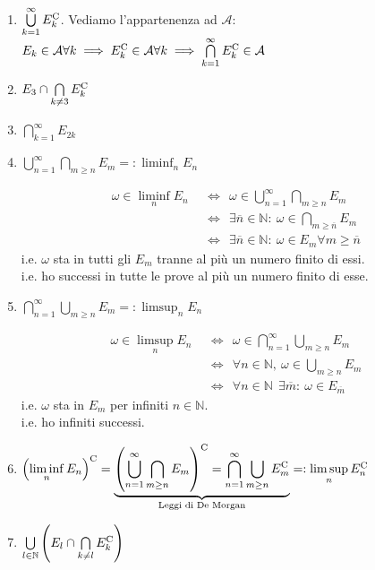 \begin{enumerate}
	\item $\bigcup\limits _{k=1}^{\infty } E_{k}^{\mathrm{C}}$. Vediamo l'appartenenza ad $\mathcal{A}$: $E_{k} \in \mathcal{A} \forall k\implies  E_{k}^{\mathrm{C}} \in \mathcal{A} \forall k\implies  \bigcap\limits _{k=1}^{\infty } E_{k}^{\mathrm{C}} \in \mathcal{A}$
	\item $E_{3} \cap \bigcap\limits _{k\neq 3} E_{k}^{\mathrm{C}}$
	\item $\bigcap\limits _{k=1}^{\infty } E_{2k}$
	\item $\bigcup\limits _{n=1}^{\infty }\bigcap\limits _{m\geq n} E_{m} =:\liminf _{n} E_{n}$
	\begin{oss}
		\begin{align*}
			\omega \in \liminf _{n} E_{n} & \ \ \iff \ \ \omega \in \bigcup _{n=1}^{\infty }\bigcap _{m\geq n} E_{m}\\
			 & \ \ \iff \ \ \exists \overline{n} \in \mathbb{N} :\ \omega \in \bigcap _{m\geq \overline{n}} E_{m}\\
			 & \ \ \iff \ \ \exists \overline{n} \in \mathbb{N} :\ \omega \in E_{m} \forall m\geq \overline{n}
		\end{align*}
		i.e. $\omega $ sta in tutti gli $E_{m}$ tranne al più un numero finito di essi.\\
		i.e. ho successi in tutte le prove al più un numero finito di esse.
	\end{oss}
	\item $\bigcap\limits _{n=1}^{\infty }\bigcup\limits _{m\geq n} E_{m} =:\limsup _{n} E_{n}$
	\begin{oss}
		\begin{align*}
			\omega \in \limsup _{n} E_{n} & \ \ \iff \ \ \omega \in \bigcap _{n=1}^{\infty }\bigcup _{m\geq n} E_{m}\\
			 & \ \ \iff \ \ \forall n\in \mathbb{N} ,\ \omega \in \bigcup _{m\geq n} E_{m}\\
			 & \ \ \iff \ \ \forall n\in \mathbb{N} \ \ \exists \overline{m} :\ \omega \in E_{\overline{m}}
		\end{align*}
		i.e. $\omega $ sta in $E_{m}$ per infiniti $n\in \mathbb{N}$.\\
		i.e. ho infiniti successi.
	\end{oss}
	\item $\left(\liminf\limits _{n} E_{n}\right)^{\mathrm{C}} =\underbrace{\left(\bigcup\limits _{n=1}^{\infty }\bigcap\limits _{m\geq n} E_{m}\right)^{\mathrm{C}} =\bigcap\limits _{n=1}^{\infty }\bigcup\limits _{m\geq n} E_{m}^{\mathrm{C}}}_{\text{Leggi di De Morgan}} =:\limsup\limits _{n} E_{n}^{\mathrm{C}}$
	\item $\bigcup\limits _{l\in \mathbb{N}}\left( E_{l} \cap \bigcap\limits _{k\neq l} E_{k}^{\mathrm{C}}\right)$
\end{enumerate}


